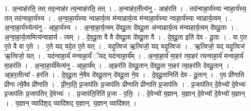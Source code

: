 \documentclass[17pt]{extarticle}
\begin{document}
1. अ॒न्वाह॑रति॒ तत् तद॒न्वाह॑र त्य॒न्वाह॑रति॒ तत् । . अ॒न्वाह॑र॒तीत्य॑नु - आह॑रति । . तद॑न्वाहा॒र्य॑स्या न्वाहा॒र्य॑स्य॒ तत् तद॑न्वाहा॒र्य॑स्य । . अ॒न्वा॒हा॒र्य॑स्या न्वाहार्य॒त्व म॑न्वाहार्य॒त्व म॑न्वाहा॒र्य॑स्या न्वाहा॒र्य॑स्या न्वाहार्य॒त्वम् । . अ॒न्वा॒हा॒र्य॑स्येत्य॑नु - आ॒हा॒र्य॑स्य । . अ॒न्वा॒हा॒र्य॒त्वम् दे॑वदू॒ता दे॑वदू॒ता अ॑न्वाहार्य॒त्व म॑न्वाहार्य॒त्वम् दे॑वदू॒ताः । . अ॒न्वा॒हा॒र्य॒त्वमित्य॑न्वाहार्य - त्वम् । . दे॒व॒दू॒ता वै वै दे॑वदू॒ता दे॑वदू॒ता वै । . दे॒व॒दू॒ता इति॑ देव - दू॒ताः । . वा ए॒त ए॒ते वै वा ए॒ते । . ए॒ते यद् यदे॒त ए॒ते यत् । . यदृ॒त्विज॑ ऋ॒त्विजो॒ यद् यदृ॒त्विजः॑ । . ऋ॒त्विजो॒ यद् यदृ॒त्विज॑ ऋ॒त्विजो॒ यत् । . यद॑न्वाहा॒र्य॑ मन्वाहा॒र्यं॑ ॅयद् यद॑न्वाहा॒र्य᳚म् । . अ॒न्वा॒हा॒र्य॑ मा॒हर॑ त्या॒हर॑ त्यन्वाहा॒र्य॑ मन्वाहा॒र्य॑ मा॒हर॑ति । . अ॒न्वा॒हा॒र्य॑मित्य॑नु - आ॒हा॒र्य᳚म् । . आ॒हर॑ति देवदू॒तान् दे॑वदू॒ता ना॒हर॑ त्या॒हर॑ति देवदू॒तान् । . आ॒हर॒तीत्या᳚ - हर॑ति । . दे॒व॒दू॒ता ने॒वैव दे॑वदू॒तान् दे॑वदू॒ता ने॒व । . दे॒व॒दू॒तानिति॑ देव - दू॒तान् । . ए॒व प्री॑णाति प्रीणा त्ये॒वैव प्री॑णाति । . प्री॒णा॒ति॒ प्र॒जाप॑तिः प्र॒जाप॑तिः प्रीणाति प्रीणाति प्र॒जाप॑तिः । . प्र॒जाप॑तिर् दे॒वेभ्यो॑ दे॒वेभ्यः॑ प्र॒जाप॑तिः प्र॒जाप॑तिर् दे॒वेभ्यः॑ । . प्र॒जाप॑ति॒रिति॑ प्र॒जा - प॒तिः॒ । . दे॒वेभ्यो॑ य॒ज्ञान्. य॒ज्ञान् दे॒वेभ्यो॑ दे॒वेभ्यो॑ य॒ज्ञान् । . य॒ज्ञान् व्यादि॑श॒द् व्यादि॑शद् य॒ज्ञान्. य॒ज्ञान् व्यादि॑शत् । \newline
\end{document}
